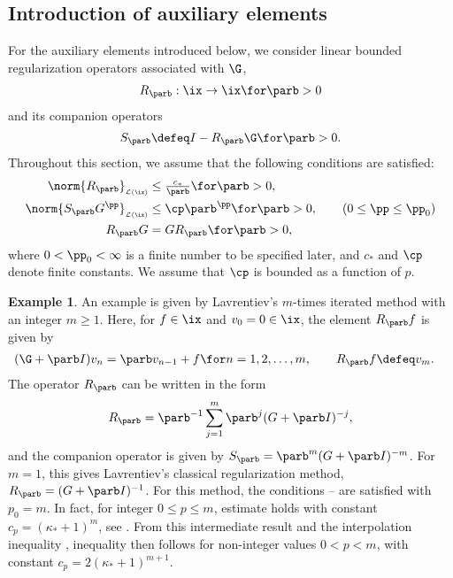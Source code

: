 \documentclass[10pt]{article}
\theoremstyle{definition}
\newtheorem{example}[theorem]{Example}
\begin{document}
\subsection{Introduction of auxiliary elements}
%
For the auxiliary elements introduced below, we consider linear bounded regularization operators associated with $ \G $,
%
\begin{align}
R_\parb: \ix \to \ix	\for \parb > 0
\label{eq:rbeta}
\end{align}
%
and its companion operators
%
\begin{align}
S_\parb \defeq  I - R_\parb \G \for \parb > 0.
\label{eq:sbeta}
\end{align}
%
Throughout this section, we assume that the following conditions are satisfied:
%
\begin{align}
\norm{ R_\parb }_{\scriptscriptstyle \mathcal{L}(\ix)} & \le \tfrac{c_*}{\parb} \for \parb > 0,
\label{eq:wachstum} \\
\norm{ S_\parb G^\pp }_{\scriptscriptstyle \mathcal{L}(\ix)} & \le \cp  \parb^{\pp} \for \parb> 0,
\qquad (0 \le \pp \le \pp_0)
\label{eq:abfall} \\
R_\parb G & = G R_\parb \for \parb > 0,
\label{eq:commute}
\end{align}
%
where $ 0 < \pp_0 < \infty $ is a finite number to be specified later, and $ c_* $ and $ \cp $ denote finite constants. We assume that $ \cp $ is bounded as a function of $ p $.
%
\begin{example} An example is given by Lavrentiev's $m$-times iterated method with an integer $ m \ge 1 $. Here, for $ f \in \ix $ and $ v_0 = 0 \in \ix $, the element $ R_\parb f $ is given by
%
\begin{align*}
(\G + \parb I)v_n & =  \parb v_{n-1} + f \for n = 1,2,\ldots,m, \qquad
R_\parb f \defeq v_m.
\end{align*}
%
The operator $ R_\parb $ can be written in the form
%
$$ R_\parb = \parb^{-1} \sum_{j=1}^{m} \parb^j (G + \parb I)^{-j},  $$
and the
companion operator is given by $ S_\parb = \parb^m (G + \parb I)^{-m} $.
For $ m = 1 $, this gives Lavrentiev's classical regularization method,
$ R_\parb = (G + \parb I)^{-1} $.
For this method, the conditions -- are satisfied with
$ p_0 = m $. In fact,
for integer $ 0 \le p \le m $,
estimate  holds with constant $ c_p = (\kappa_*+1)^m $, see
\cite[Lemma 1.1.8]{Plato95}.
From this intermediate result and the interpolation inequality
, inequality  then follows
for non-integer values $ 0 < p < m $, with constant $ c_p = 2(\kappa_*+1)^{m+1} $.
\remarkend
\end{example}
\end{document}
